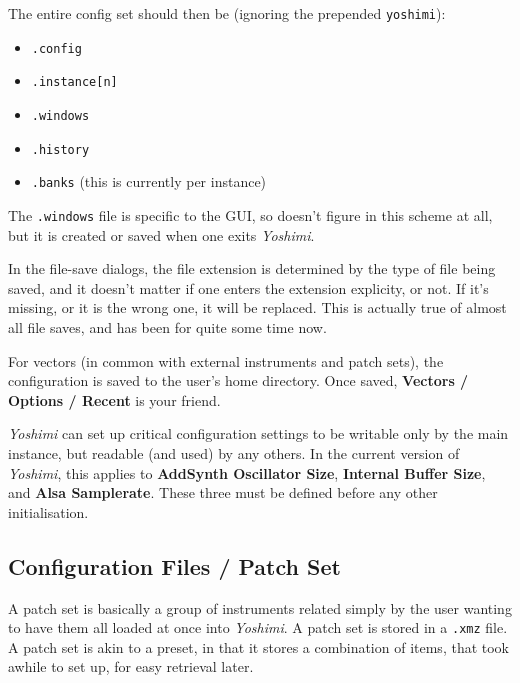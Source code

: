    The entire config set should then be (ignoring the prepended
   \texttt{yoshimi}):

   \begin{itemize}
      \item \texttt{.config}
      \item \texttt{.instance[n]}
      \item \texttt{.windows}
      \item \texttt{.history}
      \item \texttt{.banks} (this is currently per instance)
   \end{itemize}

   The \texttt{.windows} file is specific to the GUI, so doesn't figure in this
   scheme at all, but it is created or saved when one exits
   \textsl{Yoshimi}.

   In the file-save dialogs, the file extension is determined by the type of
   file being saved, and it doesn't matter if one enters the extension
   explicity, or not. If it's missing, or it is the wrong one, it will be
   replaced. This is actually true of almost all file saves, and has been for
   quite some time now.

   For vectors (in common with external instruments and patch sets),
   the configuration is saved to the user's home directory.
   Once saved, \textbf{Vectors / Options / Recent} is your friend.

   \textsl{Yoshimi} can set up critical configuration settings to be writable
   only by the main instance, but readable (and used) by any others. In the
   current version of \textsl{Yoshimi}, this applies to \textbf{AddSynth
   Oscillator Size}, \textbf{Internal Buffer Size}, and \textbf{Alsa
   Samplerate}. These three must be defined before any other initialisation.

\subsection{Configuration Files / Patch Set}
\label{subsec:configuration_patch_set}

   A patch set is basically a group of instruments related simply by the user
   wanting to have them all loaded at once into \textsl{Yoshimi}.  A patch set
   is stored in a \texttt{.xmz} file.  A patch set is akin to a preset, in that
   it stores a combination of items, that took awhile to set up, for easy
   retrieval later.

